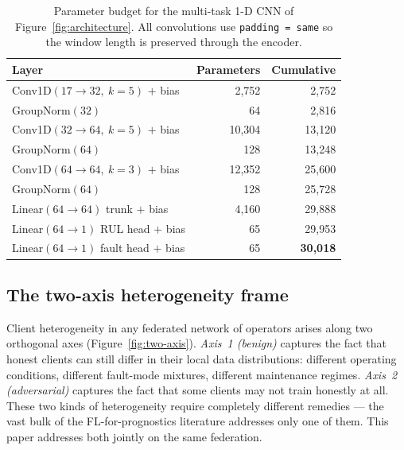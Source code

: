 \documentclass[preprint,12pt,authoryear]{elsarticle}
\begin{document}
\begin{table}[!ht]
\centering
\footnotesize
\setlength{\tabcolsep}{6pt}
\renewcommand{\arraystretch}{1.1}
\caption{Parameter budget for the multi-task 1-D CNN of Figure~\ref{fig:architecture}. All convolutions use \texttt{padding = same} so the window length is preserved through the encoder.}
\label{tab:params}
\begin{tabular}{@{}l r r@{}}
\toprule
Layer & Parameters & Cumulative \\
\midrule
Conv1D$(17 \to 32,\ k{=}5)$ $+$ bias & 2{,}752 & 2{,}752 \\
GroupNorm$(32)$                       & 64      & 2{,}816 \\
Conv1D$(32 \to 64,\ k{=}5)$ $+$ bias & 10{,}304 & 13{,}120 \\
GroupNorm$(64)$                       & 128     & 13{,}248 \\
Conv1D$(64 \to 64,\ k{=}3)$ $+$ bias & 12{,}352 & 25{,}600 \\
GroupNorm$(64)$                       & 128     & 25{,}728 \\
Linear$(64 \to 64)$ trunk $+$ bias   & 4{,}160  & 29{,}888 \\
Linear$(64 \to 1)$ RUL head $+$ bias & 65       & 29{,}953 \\
Linear$(64 \to 1)$ fault head $+$ bias & 65     & \textbf{30{,}018} \\
\bottomrule
\end{tabular}
\end{table}

\subsection{The two-axis heterogeneity frame}
\label{subsec:two-axis-frame}

Client heterogeneity in any federated network of operators arises
along two orthogonal axes (Figure~\ref{fig:two-axis}).
\emph{Axis~1 (benign)} captures the fact that honest clients can
still differ in their local data distributions: different operating
conditions, different fault-mode mixtures, different maintenance
regimes. \emph{Axis~2 (adversarial)} captures the fact that some
clients may not train honestly at all. These two kinds of heterogeneity require
completely different remedies --- the vast bulk of the
FL-for-prognostics literature addresses only one of them. This paper
addresses both jointly on the same federation.
\end{document}
